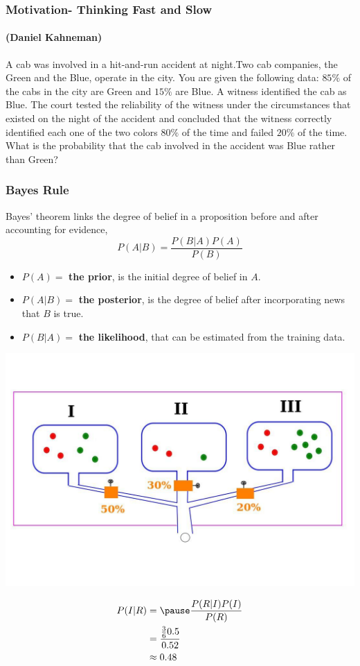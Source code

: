\documentclass[12pt,aspectratio=169]{beamer}
\begin{document}
\begin{frame}
\frametitle{Motivation- Thinking Fast and Slow}
\framesubtitle{(Daniel Kahneman)}\pause
A cab was involved in a hit-and-run accident at night.\pause Two cab companies, the Green and the Blue, operate in the city. \pause You are given the following data: \pause $85\%$ of the cabs in the city are Green and $15\%$ are Blue. \pause  A witness identified the cab as Blue. \pause The court tested the reliability of the witness under the circumstances that existed on the night of the accident \pause  and concluded that the witness correctly identified each one of the two colors $80\%$ of the time and failed $20\%$ of the time. \pause  What is the probability that the cab involved in the accident was Blue rather than Green?
\end{frame}

\begin{frame}
\frametitle{Bayes Rule}
Bayes' theorem links the degree of belief in a proposition before and after accounting for evidence, \pause
\[
P(A|B)=\frac{P(B|A)P(A)}{P(B)}
\]\pause
\begin{itemize}
\item $P(A)=$ \textbf{the prior}, is the initial degree of belief in $A$.\pause
\item $P(A|B)=$ \textbf{the posterior}, is the degree of belief after incorporating news that $B$ is true.\pause
\item $P(B|A)=$ \textbf{the likelihood}, that can be estimated from the training data. 
\end{itemize}
\end{frame}

\begin{frame}
\begin{center}
\includegraphics[scale=0.3]{balls3}
\end{center}
\[
\begin{aligned}
P(I|R)&=\pause \frac{P(R|I)P(I)}{P(R)}\\
&=\frac{\frac{3}{6}0.5}{0.52}\\
& \approx 0.48
\end{aligned}
\]
\end{frame}
\end{document}
